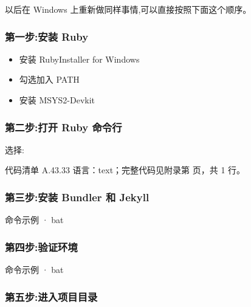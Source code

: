 \documentclass[lang=cn,scheme=chinese,color=blue,device=normal,toc=onecol,math=cm]{elegantbook}
\begin{document}
以后在 Windows 上重新做同样事情,可以直接按照下面这个顺序。\par


\subsubsection{第一步:安装 Ruby}


\begin{itemize}
\item 安装 RubyInstaller for Windows
\item 勾选加入 PATH
\item 安装 MSYS2-Devkit
\end{itemize}


\subsubsection{第二步:打开 Ruby 命令行}


选择:\par


\begin{codeindexbox}{代码清单 A.43.33}
语言：text；完整代码见附录第 \pageref{code:43:33} 页，共 1 行。
\end{codeindexbox}


\subsubsection{第三步:安装 Bundler 和 Jekyll}


\begin{inlinecodebox}{命令示例 · bat}
\end{inlinecodebox}


\subsubsection{第四步:验证环境}


\begin{inlinecodebox}{命令示例 · bat}
\end{inlinecodebox}


\subsubsection{第五步:进入项目目录}
\end{document}
